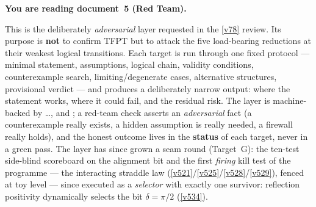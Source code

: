 
\maketitle


\noindent\textbf{You are reading \textbf{document~5} (Red Team).}


\TFPTbadges
\TFPTclaimstack[none]

\vspace{-0.6cm}

\begin{keybox}
This is the deliberately \emph{adversarial} layer requested in the \vref{v78} review. Its purpose is
\textbf{not} to confirm TFPT but to attack the five load-bearing reductions at their weakest
logical transitions. Each target is run through one fixed protocol --- minimal statement,
assumptions, logical chain, validity conditions, counterexample search, limiting/degenerate
cases, alternative structures, provisional verdict --- and produces a deliberately narrow output:
where the statement works, where it could fail, and the residual risk. The layer is machine-backed
by  \dots {},  and
; a red-team check asserts an \emph{adversarial} fact (a counterexample
really exists, a hidden assumption is really needed, a firewall really holds), and the honest
outcome lives in the \textbf{status} of each target, never in a green pass. The layer has since
grown a seam round (Target~G): the ten-test side-blind scoreboard on the alignment bit and the
first \emph{firing} kill test of the programme --- the interacting straddle law
(\vref{v521}/\vref{v525}/\vref{v528}/\vref{v529}), fenced at toy level --- since executed as a
\emph{selector} with exactly one survivor: reflection positivity dynamically selects the bit
$\delta=\pi/2$ (\vref{v534}).
\end{keybox}

